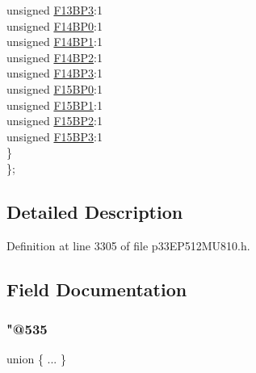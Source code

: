 \begin{DoxyCompactItemize}
\begin{tabbing}
\>\>unsigned \hyperlink{structtag_c1_b_u_f_p_n_t4_b_i_t_s_a36ec0637bd7ec69bb46cacb8be55e411}{F13BP3}:1\\
\>\>unsigned \hyperlink{structtag_c1_b_u_f_p_n_t4_b_i_t_s_aa37d136d5947ea8782cb51f88ebc5caa}{F14BP0}:1\\
\>\>unsigned \hyperlink{structtag_c1_b_u_f_p_n_t4_b_i_t_s_a8f8fc7abccca67239e2dac28160d276e}{F14BP1}:1\\
\>\>unsigned \hyperlink{structtag_c1_b_u_f_p_n_t4_b_i_t_s_a0689d3aab79ec566e3b3c2678f3a7f16}{F14BP2}:1\\
\>\>unsigned \hyperlink{structtag_c1_b_u_f_p_n_t4_b_i_t_s_ac8112a071e0688c1a8238bf110d37050}{F14BP3}:1\\
\>\>unsigned \hyperlink{structtag_c1_b_u_f_p_n_t4_b_i_t_s_acabf8c57112df4f8428962687e5fd7ff}{F15BP0}:1\\
\>\>unsigned \hyperlink{structtag_c1_b_u_f_p_n_t4_b_i_t_s_a56067c982d223515618c2f4439ae1bbb}{F15BP1}:1\\
\>\>unsigned \hyperlink{structtag_c1_b_u_f_p_n_t4_b_i_t_s_ae990b3695ab0175cd7a80ffada713ec7}{F15BP2}:1\\
\>\>unsigned \hyperlink{structtag_c1_b_u_f_p_n_t4_b_i_t_s_a83963b21ba4820db13db6f7a67ed2398}{F15BP3}:1\\
\>\} \\
\}; \\

\end{tabbing}\end{DoxyCompactItemize}


\subsection{Detailed Description}


Definition at line 3305 of file p33\+E\+P512\+M\+U810.\+h.



\subsection{Field Documentation}
\mbox{\label{structtag_c1_b_u_f_p_n_t4_b_i_t_s_acc1408c00b0649e5222cad40b164fabf}} 
\subsubsection{\texorpdfstring{"@535}{@535}}
{\footnotesize\ttfamily union \{ ... \} }

